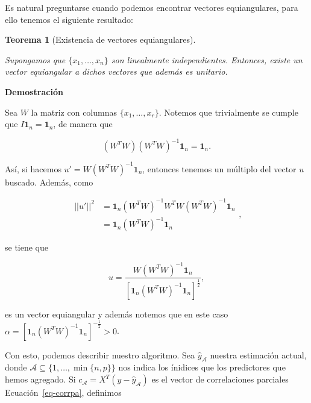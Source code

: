 \documentclass[
  letterpaper,
  DIV=11,
  numbers=noendperiod]{scrreprt}
\theoremstyle{plain}
\newtheorem{theorem}{Teorema}[chapter]
\theoremstyle{definition}
\theoremstyle{remark}
\begin{document}
Es natural preguntarse cuando podemos encontrar vectores equiangulares,
para ello tenemos el siguiente resultado:

\begin{theorem}[Existencia de vectores
equiangulares]\protect\hypertarget{thm-exis}{}\label{thm-exis}

Supongamos que \(\{x_1,\dots, x_n\}\) son linealmente independientes.
Entonces, existe un vector equiangular a dichos vectores que además es
unitario.

\end{theorem}

\begin{tcolorbox}[enhanced jigsaw, colframe=quarto-callout-important-color-frame, rightrule=.15mm, opacityback=0, toprule=.15mm, arc=.35mm, bottomrule=.15mm, colback=white, leftrule=.75mm, breakable, left=2mm]

\vspace{-3mm}\textbf{Demostración}\vspace{3mm}

Sea \(W\) la matriz con columnas \(\{x_1,\dots, x_r\}\). Notemos que
trivialmente se cumple que \(I\mathbf 1_n=\mathbf 1_n\), de manera que

\[ (W^TW)(W^TW)^{-1}\mathbf 1_n=\mathbf 1_n. \]

Así, si hacemos \(u'=W(W^TW)^{-1}\mathbf 1_n\), entonces tenemos un
múltiplo del vector \(u\) buscado. Además, como

\[ \begin{aligned} ||u'||^2&=\mathbf 1_n(W^TW)^{-1} W^TW(W^TW)^{-1}\mathbf 1_n\\ &=\mathbf 1_n(W^TW)^{-1}\mathbf 1_n \end{aligned}, \]

se tiene que

\[ u=\frac{W(W^TW)^{-1}\mathbf 1_n}{[\mathbf 1_n (W^TW)^{-1}\mathbf 1_n]^{\frac 12}}, 
\]

es un vector equiangular y además notemos que en este caso
\(\alpha=[\mathbf 1_n(W^TW)^{-1}\mathbf 1_n]^{-\frac 12}>0\).

\end{tcolorbox}

Con esto, podemos describir nuestro algoritmo. Sea
\(\hat y_{\mathcal A}\) nuestra estimación actual, donde
\(\mathcal A\subseteq \{1,\dots, \min\{n,p\}\}\) nos indica los ínidices
que los predictores que hemos agregado. Si
\(c_\mathcal A=X^T(y-\hat y_{\mathcal A})\) es el vector de
correlaciones parciales Ecuación~\ref{eq-corrpa}, definimos
\end{document}
